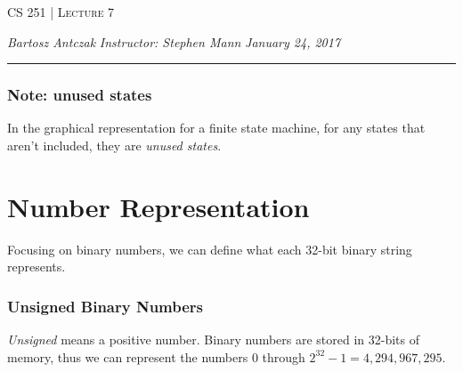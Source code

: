 \documentclass{report}
\newcommand{\lectureNum}{7}
\newcommand{\curDate}{January 24, 2017}
\newcommand{\course}{CS 251}
\newcommand{\instructor}{Stephen Mann}
\begin{document}
\begin{center}
\begin{Large}
\textsc{\course{} | Lecture \lectureNum{}}
\end{Large}
\end{center} 
\noindent \textit{Bartosz Antczak} \hfill
\textit{Instructor: \instructor{}} \hfill
\textit{\curDate{}}
\rule{\textwidth}{0.4pt}
\subsubsection{Note: unused states}
In the graphical representation for a finite state machine, for any states that aren't included, they are \textit{unused states}.
\section{Number Representation}
Focusing on binary numbers, we can define what each 32-bit binary string represents.
\subsubsection{Unsigned Binary Numbers}
\textit{Unsigned} means a positive number. Binary numbers are stored in 32-bits of memory, thus we can represent the numbers 0 through $2^{32}-1 = 4,294,967,295$.
\end{document}
